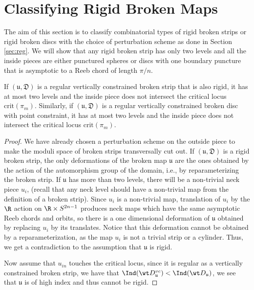 \section{Classifying Rigid Broken Maps}\label{sec:classif}
The aim of this section is to classify combinatorial types of rigid broken strips or rigid broken discs with the choice of perturbation scheme as done in Section \ref{sec:reg}. We will show that any rigid broken strip has only two levels and all the inside pieces are either punctured spheres or  discs with one boundary puncture that is asymptotic to a Reeb chord of length $\pi/n$. 

\begin{lemma}\label{lemm:2level}
If $(\mathfrak{u,D})$ is a regular vertically constrained broken strip  that is also rigid, it has at most two levels and the inside piece does not intersect the critical locus $\text{crit}(\pi_m)$. Similarly, if  $(\mathfrak{u,D})$ is a regular vertically constrained broken disc with point constraint, it has  at most two levels and the inside piece does not intersect the critical locus $\text{crit}(\pi_m)$.
\end{lemma}

\begin{proof}
We have already chosen a perturbation scheme on the outside piece to make the moduli space of broken strips transversally cut out. If $(\mathfrak{u,D})$ is
a rigid broken strip, the only deformations of the broken map $\mathfrak{u}$ are the ones obtained by the action of the automorphism group of the domain, i.e., by reparameterizing the broken strip. If $\mathfrak{u}$ has more than two levels, there will be a non-trivial neck piece $u_i$, (recall that any neck level should have a non-trivial map from the definition of a broken strip). Since $u_i$ is a non-trivial map,  translation of $u_i$ by the $\R $ action on $\R \times S^{2n-1}$ produces neck maps which have the same asymptotic Reeb chords and orbits, so there is a one dimensional deformation of  $\mathfrak{u}$ obtained by replacing $u_i$ by its translates. Notice that this deformation cannot be obtained by a reparameterization, as the map $u_i$ is not a trivial strip or a cylinder. Thus, we get a contradiction to the assumption that $\mathfrak{u}$ is rigid.

\noindent Now assume that $u_{in}$ touches the critical locus, since it is regular as a vertically constrained broken strip, we have that $\Ind(\wt D^{vc}_{\mathfrak{u}}) < \Ind(\wt D_{\mathfrak{u}}) $, we see that $\mathfrak{u}$ is of high index and thus cannot be rigid.
\end{proof}



